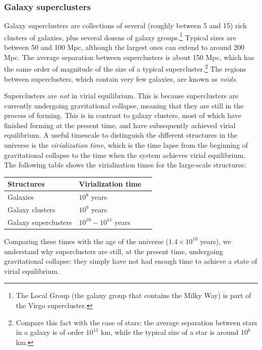 \documentclass[11pt, a4paper,oneside,openright]{book}
\numberwithin{equation}{section}
\begin{document}
\subsubsection{Galaxy superclusters}

Galaxy superclusters are collections of several (roughly between 5 and 15) rich clusters of galaxies, plus several dozens of galaxy groups.\footnote{The Local Group (the galaxy group that contains the Milky Way) is part of the Virgo supercluster.} Typical sizes are between 50 and 100 Mpc, although the largest ones can extend to around 200 Mpc. The average separation between superclusters is about 150 Mpc, which has the same order of magnitude of the size of a typical supercluster.\footnote{Compare this fact with the case of stars: the average separation between stars in a galaxy is of order $10^{13}$ km, while the typical size of a star is around $10^6$ km.} The regions between superclusters, which contain very few galaxies, are known as {\it voids}.

Superclusters are {\it not} in virial equilibrium. This is because superclusters are currently undergoing gravitational collapse, meaning that they are still in the process of forming. This is in contrast to galaxy clusters, most of which have finished forming at the present time, and have subsequently achieved virial equilibrium. A useful timescale to distinguish the different structures in the universe is the {\it virialization time}, which is the time lapse from the beginning of gravitational collapse to the time when the system achieves virial equilibrium. The following table shows the virialization times for the large-scale structures:
\begin{table}[ht]
\begin{center}
\begin{tabular}{p{5cm} l l} \hline\hline
Structures & Virialization time  \\ \hline
Galaxies & $10^8$ years \\
Galaxy clusters & $10^9$ years \\
Galaxy superclusters & $10^{10}-10^{11}$ years \\ \hline\hline
\end{tabular}
\end{center}
\end{table}

Comparing these times with the age of the universe ($1.4\times10^{10}$ years), we understand why superclusters are still, at the present time, undergoing gravitational collapse: they simply have not had enough time to achieve a state of virial equilibrium.
\end{document}
